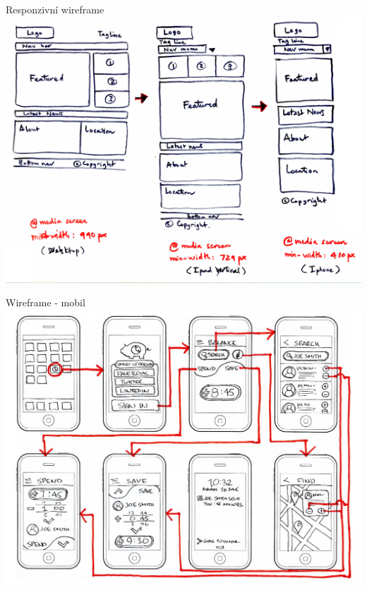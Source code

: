 \documentclass{beamer}
\begin{document}
\begin{frame}{Responzivní wireframe}
	  \includegraphics[width=\columnwidth]{responsive-wireframe}
\end{frame}

\begin{frame}{Wireframe - mobil}
	  \includegraphics[width=\columnwidth]{storyboard-map}
\end{frame}
\end{document}
